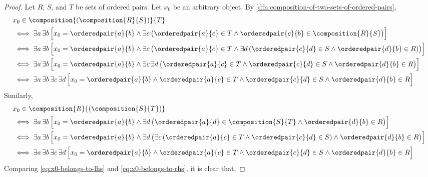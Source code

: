 \begin{proof}
    Let \( R \), \( S \), and \( T \) be sets of ordered pairs.
    Let \( x_{0} \) be an arbitrary object. By \cref{dfn:composition-of-two-sets-of-ordered-pairs},
    \begin{align}
        \label{eq:x0-belongs-to-lhs}
        &x_{0} \in \composition{\mleft( \composition{R}{S} \mright)}{T} \notag \\
        &\iff
        \exists a \, \exists b \,
        \Big[ x_{0} = \orderedpair{a}{b} \land \exists c \, \big( \orderedpair{a}{c} \in T \land \orderedpair{c}{b} \in \composition{R}{S} \big) \Big] \notag \\
        &\iff
        \exists a \, \exists b \,
        \Big[ x_{0} = \orderedpair{a}{b} \land \exists c \, \big( \orderedpair{a}{c} \in T \land
        \exists d \, \mleft( \orderedpair{c}{d} \in S \land \orderedpair{d}{b} \in R \mright) \big) \Big] \notag \\
        &\iff
        \exists a \, \exists b \,
        \Big[ x_{0} = \orderedpair{a}{b} \land \exists c \, \exists d \,
        \big( \orderedpair{a}{c} \in T \land \orderedpair{c}{d} \in S \land \orderedpair{d}{b} \in R \big) \Big] \notag \\
        &\iff
        \exists a \, \exists b \, \exists c \, \exists d \,
        \Big[ x_{0} = \orderedpair{a}{b} \land \orderedpair{a}{c} \in T \land \orderedpair{c}{d} \in S \land \orderedpair{d}{b} \in  R \Big]
    \end{align}
    Similarly,
    \begin{align}
        \label{eq:x0-belongs-to-rhs}
        &x_{0} \in \composition{R}{\mleft( \composition{S}{T} \mright)} \notag \\
        &\iff
        \exists a \, \exists b \,
        \Big[ x_{0} = \orderedpair{a}{b} \land \exists d \, \big( \orderedpair{a}{d} \in \composition{S}{T} \land \orderedpair{d}{b} \in R \big) \Big] \notag \\
        &\iff
        \exists a \, \exists b \,
        \Big[ x_{0} = \orderedpair{a}{b} \land \exists d \, \big( \exists c \,
        \mleft( \orderedpair{a}{c} \in T \land \orderedpair{c}{d} \in S \mright) \land \orderedpair{d}{b} \in R \big) \Big] \notag \\
        &\iff
        \exists a \, \exists b \, \exists c \,  \exists d \,
        \Big[ x_{0} = \orderedpair{a}{b} \land \orderedpair{a}{c} \in T \land \orderedpair{c}{d} \in S \land \orderedpair{d}{b} \in R \Big]
    \end{align}
    Comparing \eqref{eq:x0-belongs-to-lhs} and \eqref{eq:x0-belongs-to-rhs}, it is clear that,

\end{proof}
